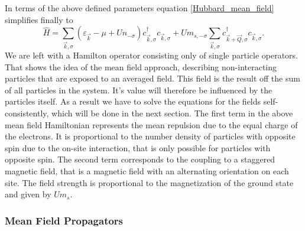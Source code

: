 \documentclass[a4paper,12pt]{report}
\begin{document}
In terms of the above defined parameters equation \ref{Hubbard_mean_field} simplifies finally to
\begin{equation}
 \hat H = \sum_{\vec k, \sigma} \left( \varepsilon_{\vec k } - \mu + U n_{-\sigma} \right) c^{\dagger}_{\vec k, \sigma} c_{\vec k ,\sigma}
	  + U m_{s,-\sigma} \sum_{\vec k, \sigma} c^{\dagger}_{\vec k + \vec Q, \sigma} c_{\vec k, \sigma}.
\end{equation}
%
%
%
We are left with a Hamilton operator consisting only of single particle operators. 
That shows the idea of the mean field approach, describing non-interacting particles that are exposed to an averaged field.
This field is the result off the sum of all particles in the system. It's value will therefore be influenced by the particles itself.
As a result we have to solve the equations for the fields self-consistently, which will be done in the next section. 
The first term in the above mean field Hamiltonian represents the mean repulsion due to the equal charge of the electrons.
It is proportional to the number density of particles with opposite spin due to the on-site interaction, that is only possible for particles with opposite spin.
The second term corresponds to the coupling to a staggered magnetic field, that is a magnetic field with an alternating orientation on each site. 
The field strength is proportional to the magnetization of the ground state and given by $Um_s$.

\subsubsection{Mean Field Propagators}
\end{document}
